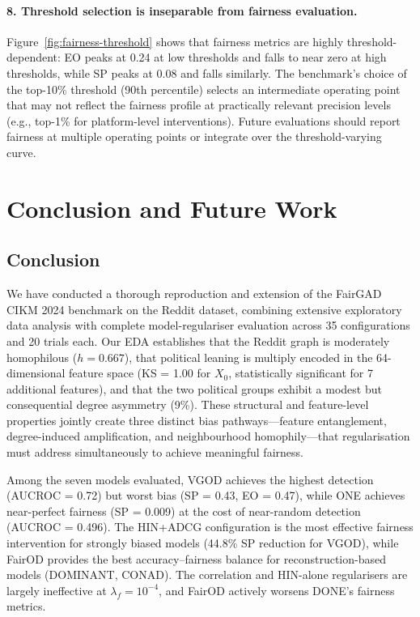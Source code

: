 \documentclass[sigconf,natbib=false]{acmart}
\begin{document}
\paragraph{8. Threshold selection is inseparable from fairness evaluation.}
Figure~\ref{fig:fairness-threshold} shows that fairness metrics are highly threshold-dependent: EO peaks at 0.24 at low thresholds and falls to near zero at high thresholds, while SP peaks at 0.08 and falls similarly. The benchmark's choice of the top-10\% threshold (90th percentile) selects an intermediate operating point that may not reflect the fairness profile at practically relevant precision levels (e.g., top-1\% for platform-level interventions). Future evaluations should report fairness at multiple operating points or integrate over the threshold-varying curve.

\section{Conclusion and Future Work}

\subsection{Conclusion}

We have conducted a thorough reproduction and extension of the FairGAD CIKM 2024 benchmark on the Reddit dataset, combining extensive exploratory data analysis with complete model-regulariser evaluation across 35 configurations and 20 trials each. Our EDA establishes that the Reddit graph is moderately homophilous ($h = 0.667$), that political leaning is multiply encoded in the 64-dimensional feature space (KS = 1.00 for $X_0$, statistically significant for 7 additional features), and that the two political groups exhibit a modest but consequential degree asymmetry (9\%). These structural and feature-level properties jointly create three distinct bias pathways—feature entanglement, degree-induced amplification, and neighbourhood homophily—that regularisation must address simultaneously to achieve meaningful fairness.

Among the seven models evaluated, VGOD achieves the highest detection (AUCROC = 0.72) but worst bias (SP = 0.43, EO = 0.47), while ONE achieves near-perfect fairness (SP = 0.009) at the cost of near-random detection (AUCROC = 0.496). The HIN+ADCG configuration is the most effective fairness intervention for strongly biased models (44.8\% SP reduction for VGOD), while FairOD provides the best accuracy–fairness balance for reconstruction-based models (DOMINANT, CONAD). The correlation and HIN-alone regularisers are largely ineffective at $\lambda_f = 10^{-4}$, and FairOD actively worsens DONE's fairness metrics.
\end{document}
